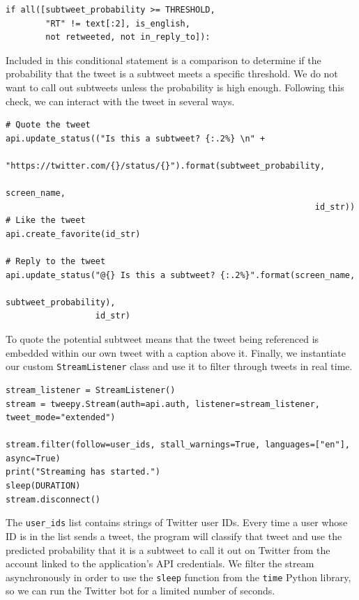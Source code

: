 \documentclass[11pt, twoside, reqno]{book}
\begin{document}
\begin{verbatim}
if all([subtweet_probability >= THRESHOLD,
        "RT" != text[:2], is_english,
        not retweeted, not in_reply_to]):
\end{verbatim}

\noindent
Included in this conditional statement is a comparison to determine if the probability that the tweet is a subtweet meets a specific threshold. We do not want to call out subtweets unless the probability is high enough. Following this check, we can interact with the tweet in several ways.

\begin{verbatim}
# Quote the tweet
api.update_status(("Is this a subtweet? {:.2%} \n" +
                   "https://twitter.com/{}/status/{}").format(subtweet_probability,
                                                              screen_name,
                                                              id_str))
# Like the tweet
api.create_favorite(id_str)

# Reply to the tweet
api.update_status("@{} Is this a subtweet? {:.2%}".format(screen_name,
                                                          subtweet_probability),
                  id_str)
\end{verbatim}

\noindent
To quote the potential subtweet means that the tweet being referenced is embedded within our own tweet with a caption above it. Finally, we instantiate our custom \verb|StreamListener| class and use it to filter through tweets in real time.

\begin{verbatim}
stream_listener = StreamListener()
stream = tweepy.Stream(auth=api.auth, listener=stream_listener, tweet_mode="extended")

stream.filter(follow=user_ids, stall_warnings=True, languages=["en"], async=True)
print("Streaming has started.")
sleep(DURATION)
stream.disconnect()
\end{verbatim}

\noindent
The \verb|user_ids| list contains strings of Twitter user IDs. Every time a user whose ID is in the list sends a tweet, the program will classify that tweet and use the predicted probability that it is a subtweet to call it out on Twitter from the account linked to the application's API credentials. We filter the stream asynchronously in order to use the \verb|sleep| function from the \verb|time| Python library, so we can run the Twitter bot for a limited number of seconds.
\end{document}
